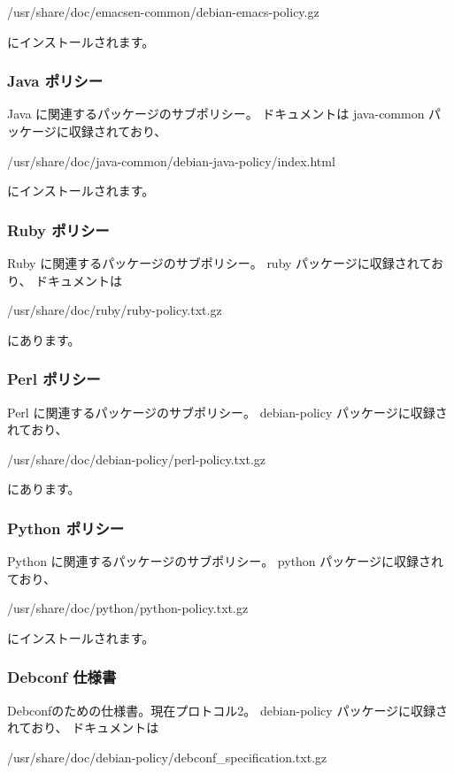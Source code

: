 \documentclass[mingoth,a4paper]{jsarticle}
\begin{document}
        /usr/share/doc/emacsen-common/debian-emacs-policy.gz

        にインストールされます。

    \subsubsection{Java ポリシー}
        Java に関連するパッケージのサブポリシー。
        ドキュメントは
        java-common パッケージに収録されており、

        /usr/share/doc/java-common/debian-java-policy/index.html

        にインストールされます。

    \subsubsection{Ruby ポリシー}
        Ruby に関連するパッケージのサブポリシー。
        ruby パッケージに収録されており、
        ドキュメントは

        /usr/share/doc/ruby/ruby-policy.txt.gz

	にあります。

    \subsubsection{Perl ポリシー}
        Perl に関連するパッケージのサブポリシー。
        debian-policy パッケージに収録されており、

        /usr/share/doc/debian-policy/perl-policy.txt.gz

        にあります。

    \subsubsection{Python ポリシー}
        Python に関連するパッケージのサブポリシー。
        python パッケージに収録されており、

        /usr/share/doc/python/python-policy.txt.gz

        にインストールされます。

    \subsubsection{Debconf 仕様書}
        Debconfのための仕様書。現在プロトコル2。
        debian-policy パッケージに収録されており、
        ドキュメントは

        /usr/share/doc/debian-policy/debconf\_specification.txt.gz
\end{document}
